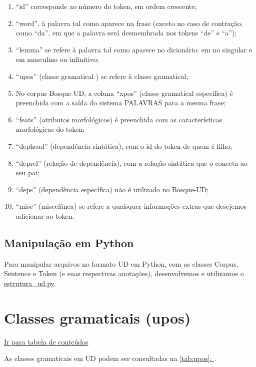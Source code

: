 \documentclass[output=paper,colorlinks,citecolor=brown]{langscibook}
\newcommand*{\fullref}[1]{\hyperref[{#1}]{\autoref*{#1}: \nameref*{#1}}} %
\begin{document}
\begin{enumerate}
    \item “id” corresponde ao número do token, em ordem crescente;
    \item “word”, à palavra tal como aparece na frase (exceto no caso de contração, como “da”, em que a palavra será desmembrada nos tokens “de” e “a”);
    \item “lemma” se refere à palavra tal como aparece no dicionário: em no singular e em masculino ou infinitivo;
    \item “upos” (classe gramatical ) se refere à classe gramatical;
    \item No corpus Bosque-UD, a coluna “xpos” (classe gramatical específica) é preenchida com a saída do sistema PALAVRAS para a mesma frase;
    \item “feats” (atributos morfológicos) é preenchida com as características morfológicas do token;
    \item “dephead” (dependência sintática), com o id do token de quem é filho;
    \item “deprel” (relação de dependência), com a relação sintática que o conecta ao seu pai;
    \item “deps” (dependência específica) não é utilizado no Bosque-UD;
    \item “misc” (miscelânea) se refere a quaisquer informações extras que desejemos adicionar ao token.
\end{enumerate}{}

\section{Manipulação em Python}\label{sec:python}



Para manipular arquivos no formato UD em Python, com as classes Corpus, Sentence e Token (e suas respectivas anotações), desenvolvemos e utilizamos o \href{https://github.com/alvelvis/ACDC-UD/blob/master/estrutura_ud.py}{estrutura\_ud.py}.

\chapter{Classes gramaticais (upos)}\label{sec:upos}

\hyperlink{toc}{Ir para tabela de conteúdos\\}



As classes gramaticais em UD podem ser consultadas na \fullref{tab:upos}.
\end{document}
